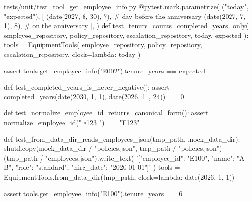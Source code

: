 \documentclass[11pt,letterpaper]{article}
\renewcommand{\_}{\textunderscore\allowbreak}
\begin{document}
\begin{codebox}{tests/unit/test_tool_get_employee_info.py}
@pytest.mark.parametrize(
    ("today", "expected"),
    [
        (date(2027, 6, 30), 7),  # day before the anniversary
        (date(2027, 7, 1), 8),  # on the anniversary
    ],
)
def test_tenure_counts_completed_years_only(
    employee_repository, policy_repository, escalation_repository, today, expected
):
    tools = EquipmentTools(
        employee_repository, policy_repository, escalation_repository, clock=lambda: today
    )

    assert tools.get_employee_info("E002").tenure_years == expected


def test_completed_years_is_never_negative():
    assert completed_years(date(2030, 1, 1), date(2026, 11, 24)) == 0


def test_normalize_employee_id_returns_canonical_form():
    assert normalize_employee_id("  e123 ") == "E123"


def test_from_data_dir_reads_employees_json(tmp_path, mock_data_dir):
    shutil.copy(mock_data_dir / "policies.json", tmp_path / "policies.json")
    (tmp_path / "employees.json").write_text(
        '[{"employee_id": "E100", "name": "A B", "role": "standard", "hire_date": "2020-01-01"}]'
    )
    tools = EquipmentTools.from_data_dir(tmp_path, clock=lambda: date(2026, 1, 1))

    assert tools.get_employee_info("E100").tenure_years == 6
\end{codebox}
\end{document}
